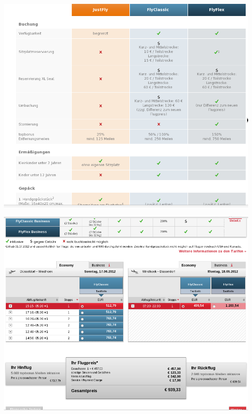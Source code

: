 \documentclass[11pt]{article}
\begin{document}














\includegraphics[scale=0.45]{Flug_Air_Berlin/Bildschirmfoto_am_2012-06-13_14_47_20.png} 

\includegraphics[scale=0.45]{Flug_Air_Berlin/Bildschirmfoto_am_2012-06-13_14_47_22.png} 
\end{document}
